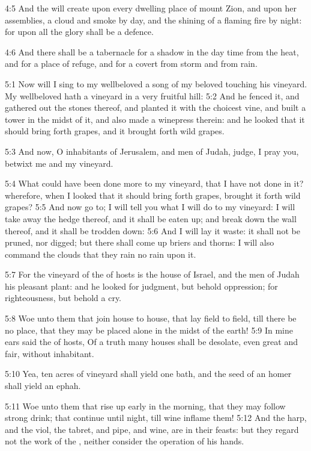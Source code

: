 4:5 And the \LORD will create upon every dwelling place of mount Zion,
and upon her assemblies, a cloud and smoke by day, and the shining of
a flaming fire by night: for upon all the glory shall be a defence.

4:6 And there shall be a tabernacle for a shadow in the day time from
the heat, and for a place of refuge, and for a covert from storm and
from rain.

5:1 Now will I sing to my wellbeloved a song of my beloved touching
his vineyard. My wellbeloved hath a vineyard in a very fruitful hill:
5:2 And he fenced it, and gathered out the stones thereof, and planted
it with the choicest vine, and built a tower in the midst of it, and
also made a winepress therein: and he looked that it should bring
forth grapes, and it brought forth wild grapes.

5:3 And now, O inhabitants of Jerusalem, and men of Judah, judge, I
pray you, betwixt me and my vineyard.

5:4 What could have been done more to my vineyard, that I have not
done in it? wherefore, when I looked that it should bring forth
grapes, brought it forth wild grapes?  5:5 And now go to; I will tell
you what I will do to my vineyard: I will take away the hedge thereof,
and it shall be eaten up; and break down the wall thereof, and it
shall be trodden down: 5:6 And I will lay it waste: it shall not be
pruned, nor digged; but there shall come up briers and thorns: I will
also command the clouds that they rain no rain upon it.

5:7 For the vineyard of the \LORD of hosts is the house of Israel, and
the men of Judah his pleasant plant: and he looked for judgment, but
behold oppression; for righteousness, but behold a cry.

5:8 Woe unto them that join house to house, that lay field to field,
till there be no place, that they may be placed alone in the midst of
the earth!  5:9 In mine ears said the \LORD of hosts, Of a truth many
houses shall be desolate, even great and fair, without inhabitant.

5:10 Yea, ten acres of vineyard shall yield one bath, and the seed of
an homer shall yield an ephah.

5:11 Woe unto them that rise up early in the morning, that they may
follow strong drink; that continue until night, till wine inflame
them!  5:12 And the harp, and the viol, the tabret, and pipe, and
wine, are in their feasts: but they regard not the work of the \LORD,
neither consider the operation of his hands.

